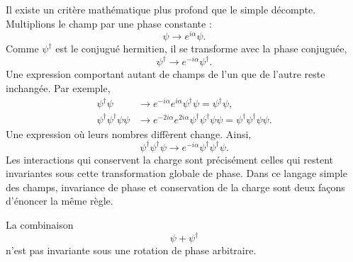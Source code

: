 \begin{classroomqa}
\end{classroomqa}

Il existe un critère mathématique plus profond que le simple décompte. Multiplions le champ par une phase constante :
\begin{equation}
\psi\longrightarrow e^{i\alpha}\psi.
\end{equation}
Comme \(\psi^\dagger\) est le conjugué hermitien, il se transforme avec la phase conjuguée,
\begin{equation}
\psi^\dagger\longrightarrow e^{-i\alpha}\psi^\dagger.
\end{equation}
Une expression comportant autant de champs de l’un que de l’autre reste inchangée. Par exemple,
\begin{align}
\psi^\dagger\psi
&\longrightarrow
e^{-i\alpha}e^{i\alpha}\psi^\dagger\psi
=\psi^\dagger\psi,\\
\psi^\dagger\psi^\dagger\psi\psi
&\longrightarrow
e^{-2i\alpha}e^{2i\alpha}
\psi^\dagger\psi^\dagger\psi\psi
=\psi^\dagger\psi^\dagger\psi\psi.
\end{align}
Une expression où leurs nombres diffèrent change. Ainsi,
\begin{equation}
\psi^\dagger\psi^\dagger\psi
\longrightarrow
e^{-i\alpha}\psi^\dagger\psi^\dagger\psi.
\end{equation}
Les interactions qui conservent la charge sont précisément celles qui restent invariantes sous cette transformation globale de phase. Dans ce langage simple des champs, invariance de phase et conservation de la charge sont deux façons d’énoncer la même règle.

La combinaison
\begin{equation}
\psi+\psi^\dagger
\end{equation}
n’est pas invariante sous une rotation de phase arbitraire.

\begin{classroomqa}
\end{classroomqa}

